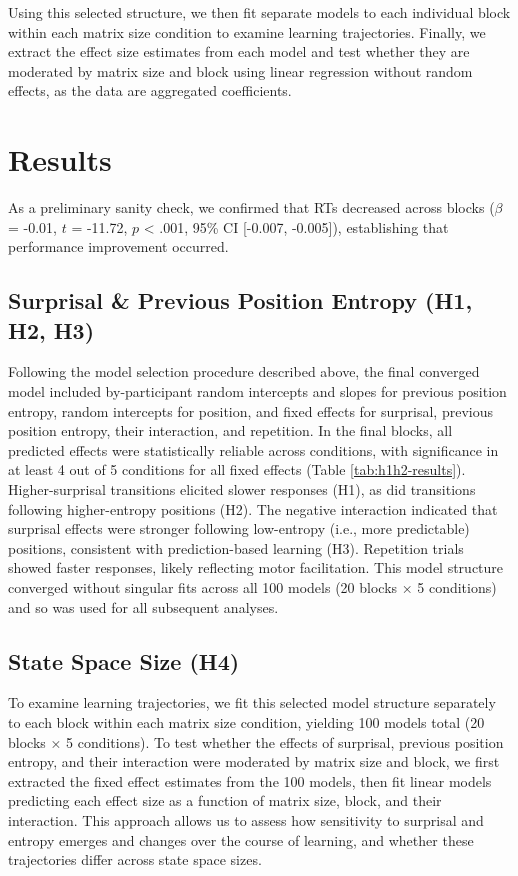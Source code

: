 \documentclass[
  10pt,
  letterpaper]{article}
\begin{document}
Using this selected structure, we then fit separate models to each
individual block within each matrix size condition to examine learning
trajectories. Finally, we extract the effect size estimates from each
model and test whether they are moderated by matrix size and block using
linear regression without random effects, as the data are aggregated
coefficients.

\section{Results}\label{results}

As a preliminary sanity check, we confirmed that RTs decreased across
blocks (\(\beta\) = -0.01, \(t\) = -11.72, \(p\) \textless{} .001, 95\%
CI {[}-0.007, -0.005{]}), establishing that performance improvement
occurred.

\subsection{Surprisal \& Previous Position Entropy (H1, H2,
H3)}\label{surprisal-previous-position-entropy-h1-h2-h3}

Following the model selection procedure described above, the final
converged model included by-participant random intercepts and slopes for
previous position entropy, random intercepts for position, and fixed
effects for surprisal, previous position entropy, their interaction, and
repetition. In the final blocks, all predicted effects were
statistically reliable across conditions, with significance in at least
4 out of 5 conditions for all fixed effects (Table
\ref{tab:h1h2-results}). Higher-surprisal transitions elicited slower
responses (H1), as did transitions following higher-entropy positions
(H2). The negative interaction indicated that surprisal effects were
stronger following low-entropy (i.e., more predictable) positions,
consistent with prediction-based learning (H3). Repetition trials showed
faster responses, likely reflecting motor facilitation. This model
structure converged without singular fits across all 100 models (20
blocks × 5 conditions) and so was used for all subsequent analyses.

\subsection{State Space Size (H4)}\label{state-space-size-h4}

To examine learning trajectories, we fit this selected model structure
separately to each block within each matrix size condition, yielding 100
models total (20 blocks × 5 conditions). To test whether the effects of
surprisal, previous position entropy, and their interaction were
moderated by matrix size and block, we first extracted the fixed effect
estimates from the 100 models, then fit linear models predicting each
effect size as a function of matrix size, block, and their interaction.
This approach allows us to assess how sensitivity to surprisal and
entropy emerges and changes over the course of learning, and whether
these trajectories differ across state space sizes.
\end{document}
